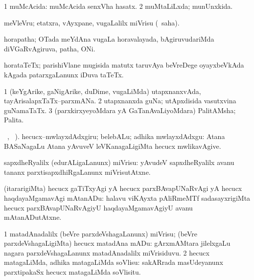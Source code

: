 \bentry
{}
\gl{\gu}
\bmng
\bnum
\num{1} muMcAcida:  muMcAcida senxVha hasatx. 
\num{2} muMtaLiLxda; munUnxkida. 
\enum
\emng
\eentry

\bentry
{}
\gl{\sakirx}
\bmng
meVleVru; etatxra, vAyxpane, \mo vugaLalilx miVrisu (\rUpa\ saha). 
\emng
\eentry

\bentry
{}
\gl{\nA}
\bmng
horapatha; OTada meYdAna \mo vugaLa horavalayada, bAgiruvudariMda diVGaRvAgiruva, patha, ONi. 
\emng
\eentry

\bentry
{}
\gl{\nA}
\bmng
horataTeTx; parishiVlane mugisida matutx taruvAya beVreDege oyayxbeVkAda kAgada patarxgaLanunx iDuva taTeTx. 
\emng
\eentry

\bentry
{}
\gl{\nA}
\bmng
\bnum
\num{1} (keYgArike, gaNigArike, duDime, \mo vugaLiMda) utapxnanxvAda, tayArisalapxTaTx--parxmANa. 
\num{2} utapxnanxda guNa; utApxdisida vasutxvina guNamaTaTx. 
\num{3} (parxkirxyeyoMdara yA GaTanAvaLiyoMdara) PalitAMsha; Palita. 
\enum
\emng
\eentry

\bentry
{}
\gl{\sakirx}
\BUkaq\ , \vakaq\ ). \bmng
hecucx--mwlayxdAdxgiru; belebALu; adhika mwlayxdAdxgu:  Atana BASaNagaLu Atana yAvuveV leVKanagaLigiMta hecucx mwlikavAgive. 
\emng
\eentry

\bentry
{}
\gl{\sakirx}
\bmng
sapxdheRyalilx (edurALigaLanunx) miVrisu:  yAvudeV sapxdheRyalilx avanu tananx parxtisapxdhiRgaLanunx miVrisutAtxne. 
\emng
\eentry

\bentry
{}
\gl{\sakirx}
\bmng
(itararigiMta) hecucx gaTiTxyAgi yA hecucx parxBAvapUNaRvAgi yA hecucx haqdayaMgamavAgi mAtanADu:  halavu viKAyxta pAliRmeMTf sadasayxrigiMta hecucx parxBAvapUNaRvAgiyU haqdayaMgamavAgiyU avanu mAtanADutAtxne. 
\emng
\eentry

\bentry
{}
\gl{\sakirx}
\bmng
\bnum
\num{1} matadAnadalilx (beVre parxdeVshagaLanunx) miVrisu; (beVre parxdeVshagaLigiMta) hecucx matadAna mADu:  gArxmAMtara jilelxgaLu nagara parxdeVshagaLanunx matadAnadalilx miVrisiduvu. 
\num{2} hecucx matagaLiMda, adhika matagaLiMda soVlisu:  sakARrada masUdeyanunx parxtipakaSx hecucx matagaLiMda soVlisitu. 
\enum
\emng
\eentry

